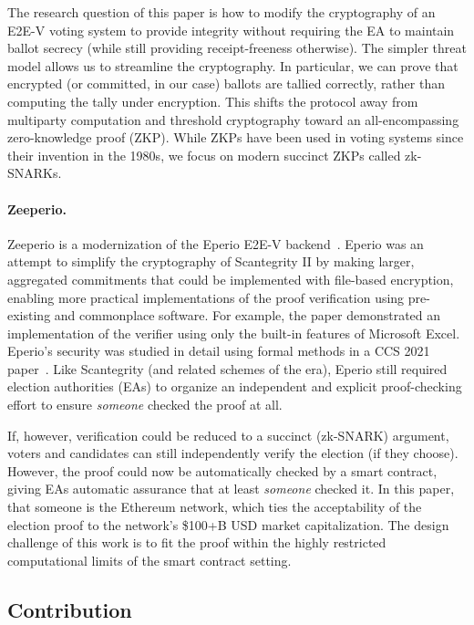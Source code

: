 The research question of this paper is how to modify the cryptography of an E2E-V voting system to provide integrity without requiring the EA to maintain ballot secrecy (while still providing receipt-freeness otherwise). 
The simpler threat model allows us to streamline the cryptography. 
In particular, we can prove that encrypted (or committed, in our case) ballots are tallied correctly, rather than computing the tally under encryption. 
This shifts the protocol away from multiparty computation and threshold cryptography toward an all-encompassing zero-knowledge proof (ZKP). 
While ZKPs have been used in voting systems since their invention in the 1980s, we focus on modern succinct ZKPs called zk-SNARKs.

\paragraph{Zeeperio.}

Zeeperio is a modernization of the Eperio E2E-V backend~\cite{ECHA10}. 
Eperio was an attempt to simplify the cryptography of Scantegrity II by making larger, aggregated commitments that could be implemented with file-based encryption, enabling more practical implementations of the proof verification using pre-existing and commonplace software. 
For example, the paper demonstrated an implementation of the verifier using only the built-in features of Microsoft Excel. 
Eperio's security was studied in detail using formal methods in a CCS 2021 paper~\cite{BDGR21}. 
Like Scantegrity (and related schemes of the era), Eperio still required election authorities (EAs) to organize an independent and explicit proof-checking effort to ensure {\em someone} checked the proof at all.

If, however, verification could be reduced to a succinct (zk-SNARK) argument, voters and candidates can still independently verify the election (if they choose). However, the proof could now be automatically checked by a smart contract, giving EAs automatic assurance that at least {\em someone} checked it. 
In this paper, that someone is the Ethereum network, which ties the acceptability of the election proof to the network's \$100+B USD market capitalization. 
The design challenge of this work is to fit the proof within the highly restricted computational limits of the smart contract setting.

\subsection{Contribution}

